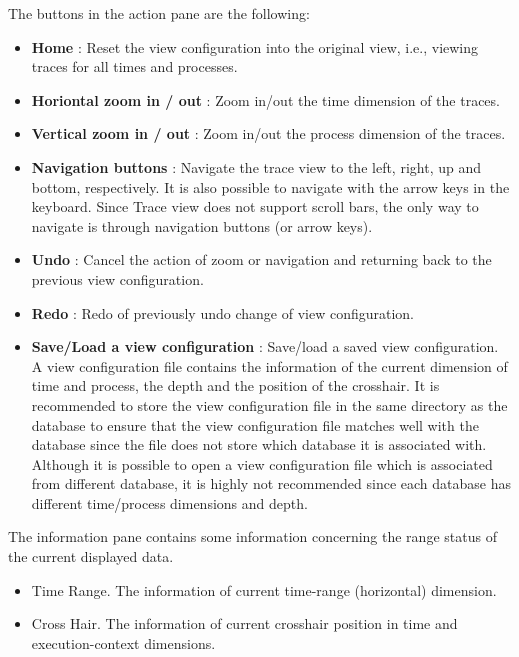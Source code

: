 \documentclass[english]{article}
\begin{document}
The buttons in the action pane are the following:
\begin{itemize}

        \item \textbf{Home} : Reset the view configuration into the original view, i.e., viewing traces for all times and processes.
        \item \textbf{Horiontal zoom in / out} : Zoom in/out the time dimension of the traces.
        \item \textbf{Vertical zoom in / out} : Zoom in/out the process dimension of the traces.
        \item \textbf{Navigation buttons} : Navigate the trace view to the left, right, up and bottom, respectively. It is also possible to navigate with the arrow keys in the keyboard. Since Trace view does not support scroll bars, the only way to navigate is through navigation buttons (or arrow keys).
        \item \textbf{Undo} : Cancel the action of zoom or navigation and returning back to the previous view configuration.
        \item \textbf{Redo} : Redo of previously undo change of view configuration.
        \item \textbf{Save/Load a view configuration} : Save/load a saved view configuration.
A view configuration file contains the information of the current dimension of time and process, the depth and the position of the crosshair.
It is recommended to store the view configuration file in the same directory as the database to ensure that the view configuration file matches well with the database since the file does not store which database it is associated with.
Although it is possible to open a view configuration file which is associated from different database, it is highly not recommended since each database has different time/process dimensions and depth.


\end{itemize}

The information pane contains some information concerning the range status of the current displayed data.
\begin{itemize}
 \item Time Range. The information of current time-range (horizontal) dimension.
 \item Cross Hair. The information of current crosshair position in time and execution-context dimensions.
\end{itemize}
\end{document}

